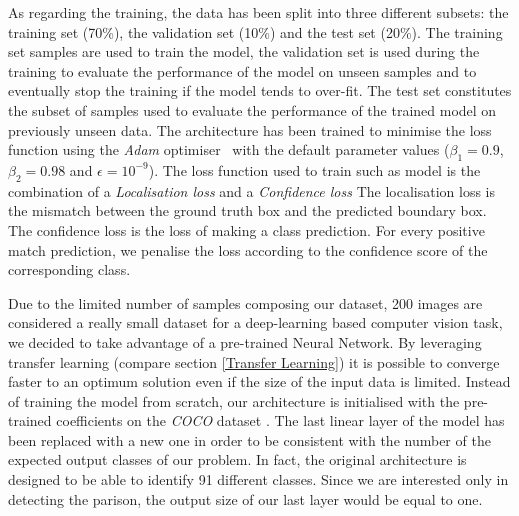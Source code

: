 As regarding the training, the data has been split into three different subsets: the training set (70\%), the validation set (10\%) and the test set (20\%). The training set samples are used to train the model, the validation set is used during the training to evaluate the performance of the model on unseen samples and to eventually stop the training if the model tends to over-fit. The test set constitutes the subset of samples used to evaluate the performance of the trained model on previously unseen data. The architecture has been trained to minimise the loss function using the  \textit{Adam} optimiser~\citep{kingma2014adam} with the default parameter values ($\beta_{1} = 0.9$, $\beta_{2} = 0.98$ and $\epsilon = 10^{-9}$). The loss function used to train such as model is the combination of a \textit{Localisation loss} and a \textit{Confidence loss} The localisation loss is the mismatch between the ground truth box and the predicted boundary box. The confidence loss is the loss of making a class prediction. For every positive match prediction, we penalise the loss according to the confidence score of the corresponding class.

Due to the limited number of samples composing our dataset, 200 images are considered a really small dataset for a deep-learning based computer vision task, we decided to take advantage of a pre-trained Neural Network. By leveraging transfer learning (compare section \ref{Transfer Learning}) it is possible to converge faster to an optimum solution even if the size of the input data is limited. Instead of training the model from scratch, our architecture is initialised with the pre-trained coefficients on the \textit{COCO} dataset \citep{lin2014microsoft}. The last linear layer of the model has been replaced with a new one in order to be consistent with the number of the expected output classes of our problem. In fact, the original architecture is designed to be able to identify 91 different classes. Since we are interested only in detecting the parison, the output size of our last layer would be equal to one.  

